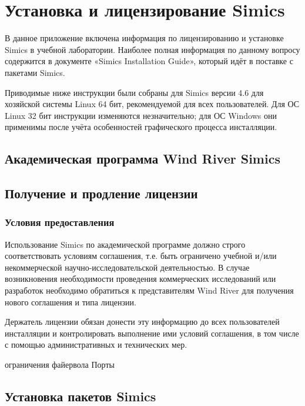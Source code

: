 \chapter{Установка и лицензирование Simics} \label{chap:installation-notes}

В данное приложение включена информация по лицензированию и установке Simics в учебной лаборатории. Наиболее полная информация по данному вопросу содержится в документе «Simics Installation Guide», который идёт в поставке с пакетами Simics.

Приводимые ниже инструкции были собраны для Simics версии 4.6 для хозяйской системы Linux 64 бит, рекомендуемой для всех пользователей. Для ОС Linux 32 бит инструкции изменяются незначительно; для ОС Windows они применимы после учёта особенностей графического процесса инсталляции.

\section{Академическая программа Wind River Simics}

\todo

\section{Получение и продление лицензии}

\todo

\subsection{Условия предоставления}

Использование Simics по академической программе должно строго соответствовать условиям соглашения, т.е. быть ограничено учебной и/или некоммерческой научно-исследовательской деятельностью. В случае возникновения необходимости проведения коммерческих исследований или разработок необходимо обратиться к представителям Wind River для получения нового соглашения и типа лицензии.

Держатель лицензии обязан донести эту информацию до всех пользователей инсталляции и контролировать выполнение ими условий соглашения, в том числе с помощью административных и технических мер.

\todo ограничения файервола
\todo Порты

\section{Установка пакетов Simics}

